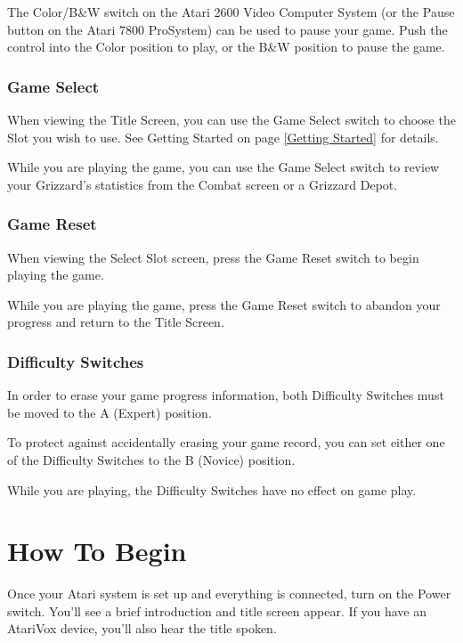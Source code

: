 \documentclass[12pt,twoside,openright,book]{memoir}
\begin{document}
The Color/B\&W  switch on the Atari  2600 Video Computer System  (or the
Pause button  on the  Atari 7800  ProSystem) can be  used to  pause your
game. Push  the control  into the  Color position to  play, or  the B\&W
position to pause the game.

\subsection{Game Select}

When viewing  the Title Screen,  you can use  the Game Select  switch to
choose  the  Slot  you  wish  to   use.  See  Getting  Started  on  page
\ref{Getting Started} for details.

While you are  playing the game, you  can use the Game  Select switch to
review   your  Grizzard's   statistics   from  the   Combat  screen   or
a Grizzard Depot.

\subsection{Game Reset}

When viewing  the Select  Slot screen,  press the  Game Reset  switch to
begin playing the game.

While you are  playing the game, press the Game  Reset switch to abandon
your progress and return to the Title Screen.

\subsection{Difficulty Switches}

In  order  to erase  your  game  progress information,  both  Difficulty
Switches must be moved to the A (Expert) position.

To protect  against accidentally erasing  your game record, you  can set
either one of the Difficulty Switches to the B (Novice) position.

While  you  are playing,  the  Difficulty  Switches  have no  effect  on
game play.

\chapter{How To Begin}\label{How To Begin}

Once your  Atari system is set  up and everything is  connected, turn on
the  Power switch.  You'll see  a  brief introduction  and title  screen
appear.  If  you   have  an  AtariVox  device,  you'll   also  hear  the
title spoken.
\end{document}
